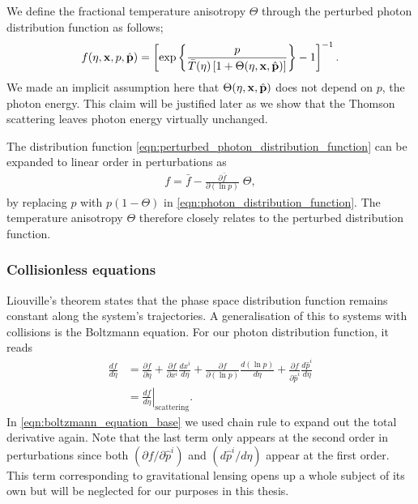 We define the fractional temperature anisotropy $\Theta$ through the perturbed photon distribution function as follows;
\begin{align}
	f(\eta, \mathbf{x}, p, \hat{\mathbf{p}}) = \left[ \exp \left\{ \frac{p}{\bar{T}(\eta)\left[1 + \Theta (\eta,\mathbf{x},\hat{\mathbf{p}}) \right]} \right\} - 1 \right]^{-1}. \label{eqn:perturbed_photon_distribution_function}
\end{align}
We made an implicit assumption here that $\Theta(\eta,\mathbf{x},\hat{\mathbf{p}})$ does not depend on $p$, the photon energy. This claim will be justified later as we show that the Thomson scattering leaves photon energy virtually unchanged.

The distribution function \eqref{eqn:perturbed_photon_distribution_function} can be expanded to linear order in perturbations as
\begin{align}
	f = \bar{f} - \frac{\partial \bar{f}}{\partial (\ln p)} \; \Theta,  \label{eqn:perturbed_photon_distribution_function_expansion}
\end{align}
by replacing $p$ with $p(1-\Theta)$ in \eqref{eqn:photon_distribution_function}. The temperature anisotropy $\Theta$ therefore closely relates to the perturbed distribution function.

\subsubsection*{Collisionless equations} \label{section:collisionless_equation}

Liouville's theorem states that the phase space distribution function remains constant along the system's trajectories. A generalisation of this to systems with collisions is the Boltzmann equation. For our photon distribution function, it reads
\begin{align}
	\frac{df}{d\eta} &= \frac{\partial f}{\partial \eta} + \frac{\partial f}{\partial x^i}\frac{dx^i}{d\eta} + \frac{\partial f}{\partial(\ln  p)}\frac{d(\ln p)}{d\eta} + \frac{\partial f}{\partial \hat{p}^i}\frac{d\hat{p}^i}{d\eta} \label{eqn:boltzmann_equation_base}\\
	&= \left. \frac{df}{d\eta} \right|_\text{scattering} . \label{eqn:boltzmann_equation_base_scattering}
\end{align}
In \eqref{eqn:boltzmann_equation_base} we used chain rule to expand out the total derivative again. Note that the last term only appears at the second order in perturbations since both $(\partial f/\partial \hat{p}^i)$ and $(d\hat{p}^i/d\eta)$ appear at the first order. This term corresponding to gravitational lensing opens up a whole subject of its own but will be neglected for our purposes in this thesis.


